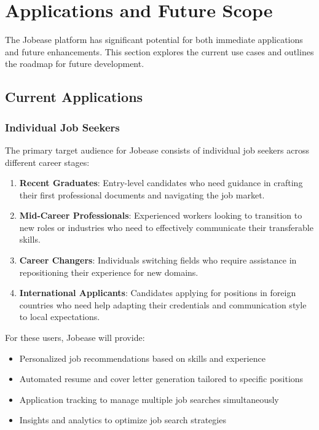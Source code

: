 \documentclass[12pt,a4paper]{report}
\begin{document}
\chapter{Applications and Future Scope}

The Jobease platform has significant potential for both immediate applications and future enhancements. This section explores the current use cases and outlines the roadmap for future development.

\section*{Current Applications}

\subsection*{Individual Job Seekers}

The primary target audience for Jobease consists of individual job seekers across different career stages:

\begin{enumerate}
    \item \textbf{Recent Graduates}: Entry-level candidates who need guidance in crafting their first professional documents and navigating the job market.
    \item \textbf{Mid-Career Professionals}: Experienced workers looking to transition to new roles or industries who need to effectively communicate their transferable skills.
    \item \textbf{Career Changers}: Individuals switching fields who require assistance in repositioning their experience for new domains.
    \item \textbf{International Applicants}: Candidates applying for positions in foreign countries who need help adapting their credentials and communication style to local expectations.
\end{enumerate}

For these users, Jobease will provide:
\begin{itemize}
    \item Personalized job recommendations based on skills and experience
    \item Automated resume and cover letter generation tailored to specific positions
    \item Application tracking to manage multiple job searches simultaneously
    \item Insights and analytics to optimize job search strategies
\end{itemize}
\end{document}
